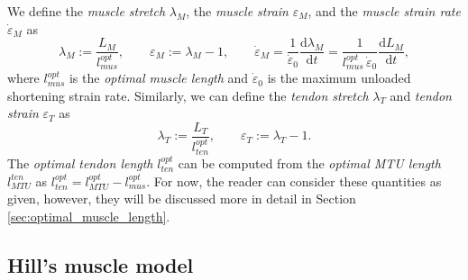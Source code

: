 \documentclass{sfuthesis}
\numberwithin{equation}{chapter}
\numberwithin{figure}{chapter}
\numberwithin{table}{chapter}
\theoremstyle{definition}
\newcommand{\dder}[2]{\dfrac{\mathrm{d} #1}{\mathrm{d} #2}}
\newcommand{\depsilon}{\dot{\varepsilon}}
\begin{document}
We define the \textit{muscle stretch} $\lambda_M$, the \textit{muscle strain} $\varepsilon_M$, and the \textit{muscle strain rate} $\depsilon_M$ as
\begin{equation} \label{eq:def_stretch_strain_rate_muscle}
    \lambda_M := \dfrac{L_M}{l_{mus}^{opt}}, \qquad \varepsilon_M := \lambda_M - 1, \qquad \depsilon_M = \dfrac{1}{\depsilon_0} \dder{\lambda_M}{t} = \dfrac{1}{l_{mus}^{opt} \, \depsilon_0} \dder{L_M}{t},
\end{equation}
where $l_{mus}^{opt}$ is the \textit{optimal muscle length} and $\depsilon_0$ is the maximum unloaded shortening strain rate. Similarly, we can define the \textit{tendon stretch} $\lambda_T$ and \textit{tendon strain} $\varepsilon_T$ as
\begin{equation}
    \lambda_T := \dfrac{L_T}{l^{opt}_{ten}}, \qquad \varepsilon_T := \lambda_T - 1.
\end{equation} 
The \textit{optimal tendon length} $l_{ten}^{opt}$ can be computed from the \textit{optimal MTU length} $l_{MTU}^{ten}$ as  $l_{ten}^{opt} = l_{MTU}^{opt} - l_{mus}^{opt}$. For now, the reader can consider these quantities as given, however, they will be discussed more in detail in Section \ref{sec:optimal_muscle_length}.



\subsection{Hill's muscle model}
\end{document}
